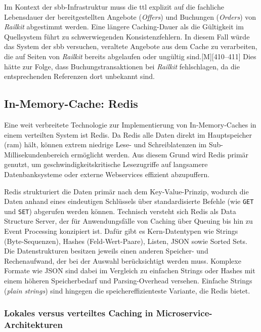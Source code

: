 Im Kontext der \ac{sbb}-Infrastruktur muss die \ac{ttl} explizit auf die fachliche Lebensdauer der bereitgestellten Angebote (\textit{Offers}) und Buchungen (\textit{Orders}) von \textit{Railkit} abgestimmt werden. Eine längere Caching-Dauer als die Gültigkeit im Quellsystem führt zu schwerwiegenden Konsistenzfehlern. In diesem Fall würde das System der \ac{sbb} versuchen, veraltete Angebote aus dem Cache zu verarbeiten, die auf Seiten von \textit{Railkit} bereits abgelaufen oder ungültig sind.[M][410--411]
Dies hätte zur Folge, dass Buchungstransaktionen bei \textit{Railkit} fehlschlagen, da die entsprechenden Referenzen dort unbekannt sind.

\subsection{In-Memory-Cache: Redis}
\label{subsec:redis}

Eine weit verbreitete Technologie zur Implementierung von In-Memory-Caches in einem verteilten System ist Redis. Da Redis alle Daten direkt im Hauptspeicher (\ac{ram}) hält, können extrem niedrige Lese- und Schreiblatenzen im Sub-Millisekundenbereich ermöglicht werden. Aus diesem Grund wird Redis primär genutzt, um geschwindigkeitskritische Lesezugriffe auf langsamere Datenbanksysteme oder externe Webservices effizient abzupuffern.

Redis strukturiert die Daten primär nach dem Key-Value-Prinzip, wodurch die Daten anhand eines eindeutigen Schlüssels über standardisierte Befehle (wie \texttt{GET} und \texttt{SET}) abgerufen werden können.
Technisch versteht sich Redis als \glqq{}Data Structure Server\grqq{}, der für Anwendungsfälle von Caching über Queuing bis hin zu Event Processing konzipiert ist. Dafür gibt es Kern-Datentypen wie Strings (Byte-Sequenzen), Hashes (Feld-Wert-Paare), Listen, JSON sowie Sorted Sets.
Die Datenstrukturen besitzen jeweils einen anderen Speicher- und Rechenaufwand, der bei der Auswahl berücksichtigt werden muss. Komplexe Formate wie JSON sind dabei im Vergleich zu einfachen Strings oder Hashes mit einem höheren Speicherbedarf und Parsing-Overhead versehen. Einfache Strings (\textit{plain strings}) sind hingegen die speichereffizienteste Variante, die Redis bietet.

\subsubsection{Lokales versus verteiltes Caching in Microservice-Architekturen}
\label{subsubsec:redis_distributed_caching}

